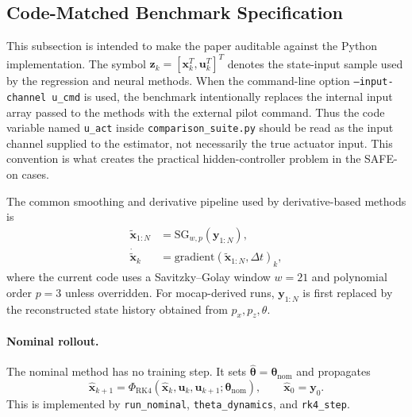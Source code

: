 \documentclass[11pt]{article}
\begin{document}
\subsection*{Code-Matched Benchmark Specification}
This subsection is intended to make the paper auditable against the Python
implementation. The symbol $\mathbf{z}_k=[\mathbf{x}_k^T,\mathbf{u}_k^T]^T$
denotes the state-input sample used by the regression and neural methods. When
the command-line option \texttt{--input-channel u\_cmd} is used, the benchmark
intentionally replaces the internal input array passed to the methods with the
external pilot command. Thus the code variable named \texttt{u\_act} inside
\texttt{comparison\_suite.py} should be read as the input channel supplied to
the estimator, not necessarily the true actuator input. This convention is what
creates the practical hidden-controller problem in the SAFE-on cases.

The common smoothing and derivative pipeline used by derivative-based methods is
\begin{align}
    \widetilde{\mathbf{x}}_{1:N}
        &= \mathrm{SG}_{w,p}\!\left(\mathbf{y}_{1:N}\right),\\
    \dot{\widetilde{\mathbf{x}}}_{k}
        &= \mathrm{gradient}\!\left(\widetilde{\mathbf{x}}_{1:N},\Delta t\right)_k,
        \label{eq:code_derivative_pipeline}
\end{align}
where the current code uses a Savitzky--Golay window $w=21$ and polynomial
order $p=3$ unless overridden. For mocap-derived runs, $\mathbf{y}_{1:N}$ is
first replaced by the reconstructed state history obtained from
$p_x,p_z,\theta$.

\paragraph{Nominal rollout.}
The nominal method has no training step. It sets
$\hat{\boldsymbol{\theta}}=\boldsymbol{\theta}_{\mathrm{nom}}$ and propagates
\[
    \hat{\mathbf{x}}_{k+1}
    =\Phi_{\mathrm{RK4}}
    \left(\hat{\mathbf{x}}_k,\mathbf{u}_k,\mathbf{u}_{k+1};
    \boldsymbol{\theta}_{\mathrm{nom}}\right),
    \qquad
    \hat{\mathbf{x}}_0=\mathbf{y}_0.
    \label{eq:code_nominal}
\]
This is implemented by \texttt{run\_nominal}, \texttt{theta\_dynamics}, and
\texttt{rk4\_step}.
\end{document}
